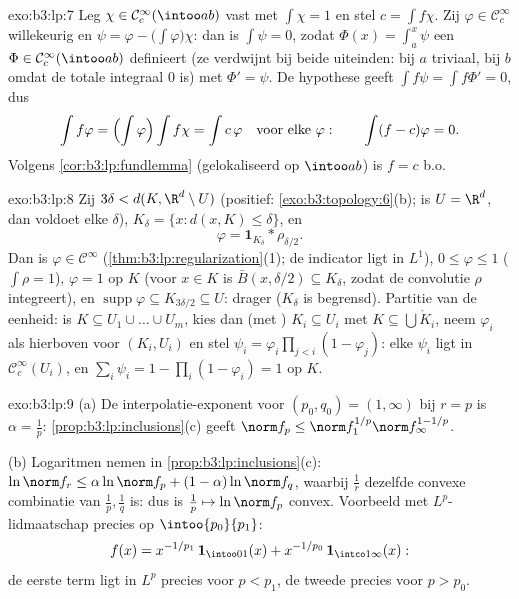 \begin{solution}{exo:b3:lp:7}
Leg $\chi \in \mathcal C_c^\infty(\intoo ab)$ vast met $\int\chi
= 1$ en stel $c = \int f\chi$. Zij $\varphi \in \mathcal
C_c^\infty$ willekeurig en $\psi = \varphi -
\bigl(\int\varphi\bigr)\chi$: dan is $\int\psi = 0$, zodat
$\Phi(x) = \int_a^x\psi$ een $\Phi \in \mathcal
C_c^\infty(\intoo ab)$ definieert (ze verdwijnt bij beide
uiteinden: bij $a$ triviaal, bij $b$ omdat de totale integraal
$0$ is) met $\Phi' = \psi$. De hypothese geeft $\int f\psi = \int
f\Phi' = 0$, dus
\[
\int f\varphi = \Bigl(\int\varphi\Bigr)\int f\chi = \int
c\,\varphi
\quad\text{voor elke } \varphi:
\qquad \int(f - c)\varphi = 0 .
\]
Volgens \cref{cor:b3:lp:fundlemma} (gelokaliseerd op $\intoo
ab$) is $f = c$ b.o.
\end{solution}

\begin{solution}{exo:b3:lp:8}
Zij $3\delta < d(K, \R^d\setminus U)$ (positief:
\cref{exo:b3:topology:6}(b); is $U = \R^d$, dan voldoet elke
$\delta$), $K_\delta = \{x : d(x, K) \leq \delta\}$, en
\[
\varphi = \mathbf 1_{K_\delta} * \rho_{\delta/2} .
\]
Dan is $\varphi \in \mathcal C^\infty$
(\cref{thm:b3:lp:regularization}(1); de indicator ligt in
$L^1$), $0 \leq \varphi \leq 1$ ($\int\rho = 1$), $\varphi = 1$
op $K$ (voor $x \in K$ is $\bar B(x, \delta/2) \subseteq
K_\delta$, zodat de convolutie $\rho$  integreert), en
$\operatorname{supp}\varphi \subseteq K_{3\delta/2} \subseteq U$:
 drager ($K_\delta$ is begrensd). Partitie van de
eenheid: is $K \subseteq U_1\cup\dots\cup U_m$, kies dan (met
)  $K_i \subseteq U_i$ met $K \subseteq
\bigcup \mathring K_i$, neem $\varphi_i$ als hierboven voor
$(K_i, U_i)$ en stel $\psi_i = \varphi_i\prod_{j <i}(1 -
\varphi_j)$: elke $\psi_i$ ligt in $\mathcal C_c^\infty(U_i)$, en
$\sum_i\psi_i = 1 - \prod_i(1 - \varphi_i) = 1$ op $K$.
\end{solution}

\begin{solution}{exo:b3:lp:9}
(a) De interpolatie-exponent voor $(p_0, q_0) = (1, \infty)$ bij
$r = p$ is $\alpha = \frac1p$: \cref{prop:b3:lp:inclusions}(c)
geeft $\norm f_p \leq \norm f_1^{1/p}\norm f_\infty^{1 - 1/p}$.

(b) Logaritmen nemen in \cref{prop:b3:lp:inclusions}(c):
$\ln\norm f_r \leq \alpha\ln\norm f_p + (1-\alpha)\ln\norm f_q$,
waarbij $\frac1r$ dezelfde convexe combinatie van $\frac1p,
\frac1q$ is: dus is $\frac1p \mapsto \ln\norm f_p$ convex.
Voorbeeld met $L^p$-lidmaatschap precies op $\intoo{p_0}{p_1}$:
\[
f(x) = x^{-1/p_1}\,\mathbf 1_{\intoo01}(x) +
x^{-1/p_0}\,\mathbf 1_{\intco1\infty}(x):
\]
de eerste term ligt in $L^p$ precies voor $p < p_1$, de tweede
precies voor $p > p_0$.
\end{solution}

